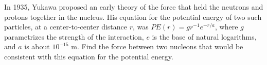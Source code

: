 In 1935, Yukawa proposed an early theory of the force
that held the neutrons and protons together in the nucleus.
His equation for the potential energy of two such particles,
at a center-to-center distance $r$, was 
$PE(r)=gr^{-1}e^{-r/a}$,
where $g$ parametrizes the strength
of the interaction, $e$ is the base of natural logarithms,
and $a$ is about $10^{-15}$ m. Find the force between two
nucleons that would be consistent with this equation for
the potential energy.
\answercheck
